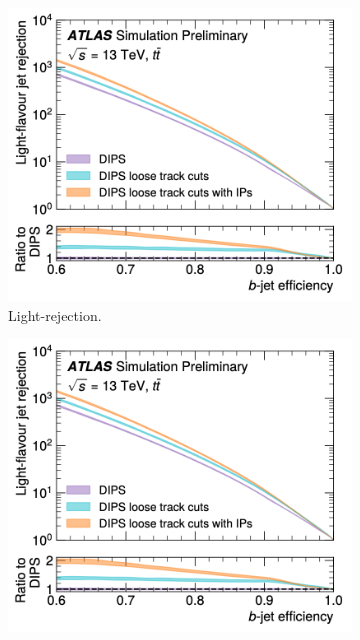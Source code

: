 \begin{figure}[h!]
  \centering
  \begin{subfigure}[b]{0.48\textwidth}
      \centering
      \includegraphics[scale=0.55]{Images/FTAG/dipsOptL.png}
      \caption{Light-rejection.} 
      \label{fig:dipsOptRocL}
  \end{subfigure}
  \hfill
  \begin{subfigure}[b]{0.48\textwidth}
      \centering
      \includegraphics[scale=0.55]{Images/FTAG/dipsOptL.png}

\end{subfigure}
\end{figure}
